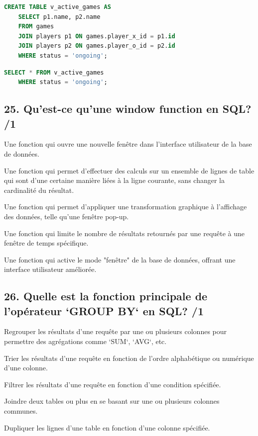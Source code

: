 \documentclass[12pt,a4paper]{article}
\begin{document}
\begin{flushleft}
\begin{choices}
    \item  \hspace{1cm}
    \begin{lstlisting}[language=SQL]
    CREATE TABLE v_active_games AS
    SELECT p1.name, p2.name
    FROM games
    JOIN players p1 ON games.player_x_id = p1.id
    JOIN players p2 ON games.player_o_id = p2.id
    WHERE status = 'ongoing';
    \end{lstlisting}

    \item  \hspace{1cm}
    \begin{lstlisting}[language=SQL]
    SELECT * FROM v_active_games
    WHERE status = 'ongoing';
    \end{lstlisting}
\end{choices}

\subsection*{25. Qu'est-ce qu'une window function en SQL? /1}
\begin{choices}
    \item Une fonction qui ouvre une nouvelle fenêtre dans l'interface utilisateur de la base de données.
    \item Une fonction qui permet d'effectuer des calculs sur un ensemble de lignes de table qui sont d'une certaine manière liées à la ligne courante, sans changer la cardinalité du résultat.
    \item Une fonction qui permet d'appliquer une transformation graphique à l'affichage des données, telle qu'une fenêtre pop-up.
    \item Une fonction qui limite le nombre de résultats retournés par une requête à une fenêtre de temps spécifique.
    \item Une fonction qui active le mode "fenêtre" de la base de données, offrant une interface utilisateur améliorée.
\end{choices}

\subsection*{26. Quelle est la fonction principale de l'opérateur `GROUP BY` en SQL? /1}
\begin{choices}
    \item Regrouper les résultats d'une requête par une ou plusieurs colonnes pour permettre des agrégations comme `SUM`, `AVG`, etc.
    \item Trier les résultats d'une requête en fonction de l'ordre alphabétique ou numérique d'une colonne.
    \item Filtrer les résultats d'une requête en fonction d'une condition spécifiée.
    \item Joindre deux tables ou plus en se basant sur une ou plusieurs colonnes communes.
    \item Dupliquer les lignes d'une table en fonction d'une colonne spécifiée.
\end{choices}


\end{flushleft}
\end{document}
